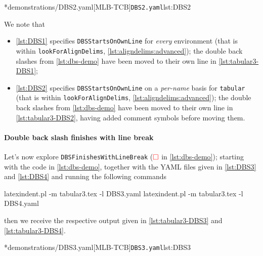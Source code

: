 		\begin{cmhtcbraster}[raster column skip=.01\linewidth]
			\cmhlistingsfromfile[style=yaml-LST]*{demonstrations/DBS2.yaml}[MLB-TCB]{\texttt{DBS2.yaml}}{lst:DBS2}
		\end{cmhtcbraster}

		We note that
		\begin{itemize}
			\item \cref{lst:DBS1} specifies \texttt{DBSStartsOnOwnLine} for
			      \emph{every} environment (that is within \texttt{lookForAlignDelims},
			      \vref{lst:aligndelims:advanced});
			      the double back slashes from \cref{lst:dbs-demo} have been moved to their own line in
			      \cref{lst:tabular3-DBS1};
			\item \cref{lst:DBS2} specifies \texttt{DBSStartsOnOwnLine} on a
			      \emph{per-name} basis for \texttt{tabular} (that is within \texttt{lookForAlignDelims},
			      \vref{lst:aligndelims:advanced});
			      the double back slashes from \cref{lst:dbs-demo} have been moved to their own line in
			      \cref{lst:tabular3-DBS2}, having added comment symbols before moving them.
		\end{itemize}

	\paragraph{Double back slash finishes with line break}
		Let's now explore \texttt{DBSFinishesWithLineBreak} ($\color{red}\square$ in
		\cref{lst:dbs-demo}); starting with the code in \cref{lst:dbs-demo}, together with the
		YAML files given in \cref{lst:DBS3} and \cref{lst:DBS4} and running the following
		commands
		\begin{commandshell}
latexindent.pl -m tabular3.tex -l DBS3.yaml
latexindent.pl -m tabular3.tex -l DBS4.yaml
\end{commandshell}
		then we receive the respective output given in \cref{lst:tabular3-DBS3} and
		\cref{lst:tabular3-DBS4}.

		\begin{cmhtcbraster}[raster column skip=.01\linewidth]
			\cmhlistingsfromfile[style=yaml-LST]*{demonstrations/DBS3.yaml}[MLB-TCB]{\texttt{DBS3.yaml}}{lst:DBS3}
		\end{cmhtcbraster}

